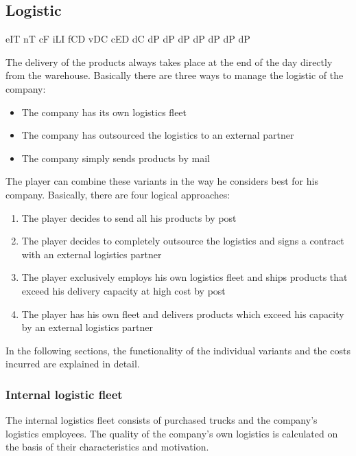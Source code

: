 \subsection{Logistic} \label{logistic_simulation}

\gls{eIT}  %
\gls{nT}   %
\gls{cF}   %
\gls{iLI}  %
\gls{fCD}  %
\gls{vDC}  %
\gls{cED}  %
\gls{dC}   %
\gls{dP}   %
\gls{dP}   %
\gls{dP}   %
\gls{dP}   %
\gls{dP}   %
\gls{dP}   %
\gls{dP}   %


The delivery of the products always takes place at the end of the day directly from the warehouse. Basically there are three ways to manage the logistic of the company: 
\begin{itemize}
    \item The company has its own logistics fleet
    \item The company has outsourced the logistics to an external partner
    \item The company simply sends products by mail
\end{itemize}

The player can combine these variants in the way he considers best for his company. Basically, there are four logical approaches:
\begin{enumerate}
    \item The player decides to send all his products by post 
    \item The player decides to completely outsource the logistics and signs a contract with an external logistics partner
    \item The player exclusively employs his own logistics fleet and ships products that exceed his delivery capacity at high cost by post
    \item The player has his own fleet and delivers products which exceed his capacity by an external logistics partner
\end{enumerate}
	
In the following sections, the functionality of the individual variants and the costs incurred are explained in detail.


\subsubsection{Internal logistic fleet}
The internal logistics fleet consists of purchased trucks and the company's logistics employees. The quality of the company's own logistics is calculated on the basis of their characteristics and motivation.

